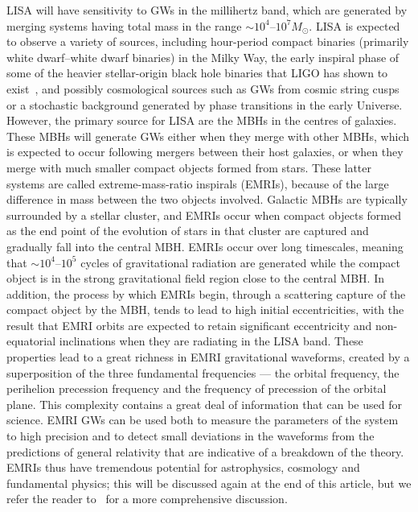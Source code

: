 \documentclass[a4paper]{jpconf}
\begin{document}
LISA will have sensitivity to GWs in the millihertz band, which are generated by merging systems having total mass in the range $\sim10^4$--$10^7M_\odot$. LISA is expected to observe a variety of sources, including hour-period compact binaries (primarily white dwarf--white dwarf binaries) in the Milky Way, the early inspiral phase of some of the heavier stellar-origin black hole binaries that LIGO has shown to exist~\cite{LIGOLISABinaries}, and possibly cosmological sources such as GWs from cosmic string cusps or a stochastic background generated by phase transitions in the early Universe. However, the primary source for LISA are the MBHs in the centres of galaxies. These MBHs will generate GWs either when they merge with other MBHs, which is expected to occur following mergers between their host galaxies, or when they merge with much smaller compact objects formed from stars. These latter systems are called extreme-mass-ratio inspirals (EMRIs), because of the large difference in mass between the two objects involved. Galactic MBHs are typically surrounded by a stellar cluster, and EMRIs occur when compact objects formed as the end point of the evolution of stars in that cluster are captured and gradually fall into the central MBH. EMRIs occur over long timescales, meaning that $\sim 10^4$--$10^5$ cycles of gravitational radiation are generated while the compact object is in the strong gravitational field region close to the central MBH. In addition, the process by which EMRIs begin, through a scattering capture of the compact object by the MBH, tends to lead to high initial eccentricities, with the result that EMRI orbits are expected to retain significant eccentricity and non-equatorial inclinations when they are radiating in the LISA band. These properties lead to a great richness in EMRI gravitational waveforms, created by a superposition of the three fundamental frequencies --- the orbital frequency, the perihelion precession frequency and the frequency of precession of the orbital plane. This complexity contains a great deal of information that can be used for science. EMRI GWs can be used both to measure the parameters of the system to high precision and to detect small deviations in the waveforms from the predictions of general relativity that are indicative of a breakdown of the theory. EMRIs thus have tremendous potential for astrophysics, cosmology and fundamental physics; this will be discussed again at the end of this article, but we refer the reader to~\cite{EMRIReview,TestGRLivRev} for a more comprehensive discussion.
\end{document}
